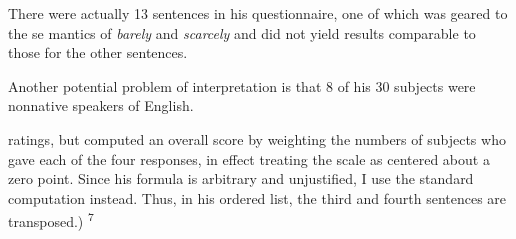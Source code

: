 \setcounter{listWWNumxlileveli}{4}
\begin{listWWNumxlileveli}
\item 
\begin{styleStandard}
There were actually 13 sentences in his questionnaire, one of which was geared to the se\- mantics of \textit{barely}\textit{ }and \textit{scarcely}\textit{ }and did not yield results comparable to those for the other sentences.
\end{styleStandard}


\item 
\begin{styleStandard}
Another potential problem of interpretation is that 8 of his 30 subjects were nonnative speakers of English.
\end{styleStandard}


\end{listWWNumxlileveli}
\clearpage\setcounter{page}{1}\begin{styleTextbody}
ratings, but computed an overall score by weighting the numbers of subjects who gave each of the four responses, in effect treating the scale as centered about a zero point. Since his formula is arbitrary and unjustified, I use the standard computation instead. Thus, in his ordered list, the third and fourth sentences are transposed.) \textsuperscript{7}
\end{styleTextbody}


